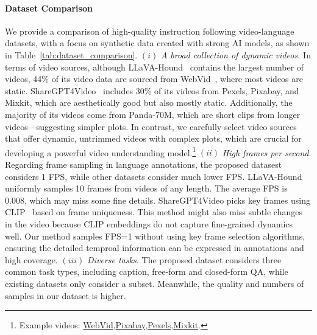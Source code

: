 \paragraph{Dataset Comparison}
We provide a comparison of high-quality instruction following video-language datasets, with a focus on synthetic data created with strong AI models, as shown in Table~\ref{tab:dataset_comparison}. 
$(i)$   \textit{A broad collection of dynamic videos.} In terms of video sources, although LLaVA-Hound~\citep{zhang2024direct} contains the largest number of videos, 44\% of its video data are sourced from WebVid~\citep{Bain21}, where most videos are static. ShareGPT4Video~\citep{chen2024sharegpt4video} includes 30\% of its videos from Pexels, Pixabay, and Mixkit, which are aesthetically good but also mostly static. Additionally, the majority of its videos come from Panda-70M, which are short clips from longer videos---suggesting simpler plots. In contrast, we carefully select video sources that offer dynamic, untrimmed videos with complex plots, which are crucial for developing a powerful video understanding model.\footnote{Example videos: \href{https://ak.picdn.net/shutterstock/videos/21179416/preview/stock-footage-aerial-shot-winter-forest.mp4}{WebVid},\href{https://pixabay.com/videos/plane-modelling-miniature-lockheed-134519/}{Pixabay},\href{https://www.pexels.com/video/a-bird-is-standing-on-the-beach-27916646/}{Pexels},\href{https://mixkit.co/free-stock-video/a-young-woman-clad-in-snugly-black-sportswear-doing-lunges-52112/}{Mixkit}.}
$(ii)$ \textit{High frames per second}. Regarding frame sampling in language annotations, the proposed datasest considers 1 FPS, while other datasets consider much lower FPS.  LLaVA-Hound uniformly samples 10 frames from videos of any length. The average FPS is 0.008, which may miss some fine details. ShareGPT4Video picks key frames using CLIP~\citep{radford2021learning} based on frame uniqueness. This method might also miss subtle changes in the video because CLIP embeddings do not capture fine-grained dynamics well. Our method samples FPS=1 without using key frame selection algorithms, ensuring the detailed temproal information can be expressed in annotations and high coverage. 
$(iii)$   \textit{Diverse tasks.} The proposed dataset considers three common task types, including caption, free-form and closed-form QA, while existing datasets only consider a subset. Meanwhile, the quality and numbers of samples in our dataset is higher.

 

